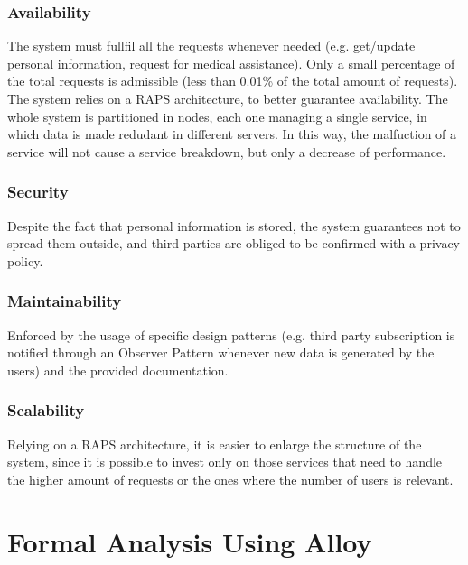 \documentclass[12pt,a4paper]{article}
\begin{document}
	\subsubsection{Availability}
	The system must fullfil all the requests whenever needed (e.g. get/update personal information, request for medical assistance). Only a small percentage of the total requests is admissible (less than 0.01\% of the total amount of requests). The system relies on a RAPS architecture, to better guarantee availability. The whole system is partitioned in nodes, each one managing a single service, in which data is made redudant in different servers. In this way, the malfuction of a service will not cause a service breakdown, but only a decrease of performance.
	\subsubsection{Security}
	Despite the fact that personal information is stored, the system guarantees not to spread them outside, and third parties are obliged to be confirmed with a privacy policy.
	\subsubsection{Maintainability}
	Enforced by the usage of specific design patterns (e.g. third party subscription is notified through an Observer Pattern whenever new data is generated by the users) and the provided documentation.
	\subsubsection{Scalability}
	Relying on a RAPS architecture, it is easier to enlarge the structure of the system, since it is possible to invest only on those services that need to handle the higher amount of requests or the ones where the number of users is relevant.
	
	
	\newpage
	\section{Formal Analysis Using Alloy}
	
	\newpage
	
\end{document}
